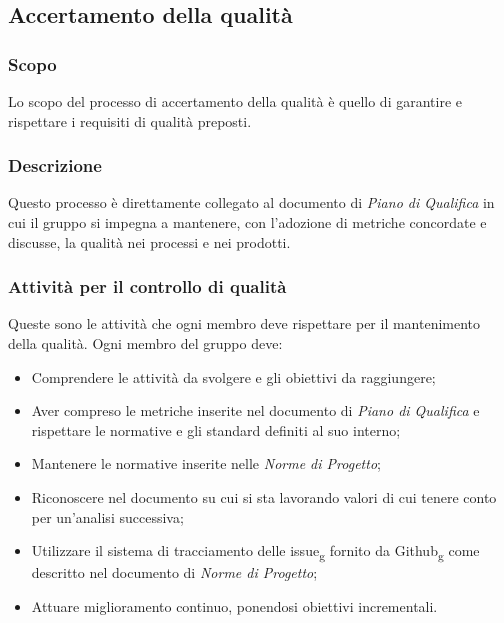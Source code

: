 \subsection{Accertamento della qualità}

\subsubsection{Scopo}
Lo scopo del processo di accertamento della qualità è quello di garantire e rispettare i requisiti di qualità preposti.
\subsubsection{Descrizione}
Questo processo è direttamente collegato al documento di \textit{Piano di Qualifica} in cui il gruppo si impegna a mantenere, con l'adozione di metriche concordate e discusse, la qualità nei processi e nei prodotti.
\subsubsection{Attività per il controllo di qualità}
Queste sono le attività che ogni membro deve rispettare per il mantenimento della qualità.
Ogni membro del gruppo deve:
\begin{itemize}
\item Comprendere le attività da svolgere e gli obiettivi da raggiungere;
\item Aver compreso le metriche inserite nel documento di \textit{Piano di Qualifica} e rispettare le normative e gli standard definiti al suo interno;
\item Mantenere le normative inserite nelle \textit{Norme di Progetto};
\item Riconoscere nel documento su cui si sta lavorando valori di cui tenere conto per un'analisi successiva;
\item Utilizzare il sistema di tracciamento delle issue\textsubscript{g} fornito da Github\textsubscript{g} come descritto nel documento di \textit{Norme di Progetto};
\item Attuare miglioramento continuo, ponendosi obiettivi incrementali.
\end{itemize}
